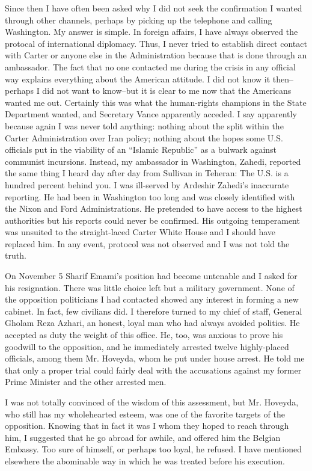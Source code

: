 Since then I have often been asked why I did not seek the confirmation I wanted through other channels, perhaps by picking up the telephone and calling Washington. My answer is simple. In foreign affairs, I have always observed the protocal of international diplomacy. Thus, I never tried to establish direct contact with Carter or anyone else in the Administration because that is done through an ambassador. The fact that no one contacted me during the crisis in any official way explains everything about the American attitude. I did not know it then-- perhaps I did not want to know--but it is clear to me now that the Americans wanted me out. Certainly this was what the human-rights champions in the State Department wanted, and Secretary Vance apparently acceded. I say apparently because again I was never told anything: nothing about the split within the Carter Administration over Iran policy; nothing about the hopes some U.S. officials put in the viability of an “Islamic Republic” as a bulwark against communist incursions. Instead, my ambassador in Washington, Zahedi, reported the same thing I heard day after day from Sullivan in Teheran: The U.S. is a hundred percent behind you. I was ill-served by Ardeshir Zahedi's inaccurate reporting. He had been in Washington too long and was closely identified with the Nixon and Ford Administrations. He pretended to have access to the highest authorities but his reports could never be confirmed. His outgoing temperament was unsuited to the straight-laced Carter White House and I should have replaced him. In any event, protocol was not observed and I was not told the truth. 

On November 5 Sharif Emami's position had become untenable and I asked for his resignation. There was little choice left but a military government. None of the opposition politicians I had contacted showed any interest in forming a new cabinet. In fact, few civilians did. I therefore turned to my chief of staff, General Gholam Reza Azhari, an honest, loyal man who had always avoided politics. He accepted as duty the weight of this office. He, too, was anxious to prove his goodwill to the opposition, and he immediately arrested twelve highly-placed officials, among them Mr. Hoveyda, whom he put under house arrest. He told me that only a proper trial could fairly deal with the accusations against my former Prime Minister and the other arrested men. 

I was not totally convinced of the wisdom of this assessment, but Mr. Hoveyda, who still has my wholehearted esteem, was one of the favorite targets of the opposition. Knowing that in fact it was I whom they hoped to reach through him, I suggested that he go abroad for awhile, and offered him the Belgian Embassy. Too sure of himself, or perhaps too loyal, he refused. I have mentioned elsewhere the abominable way in which he was treated before his execution. 


